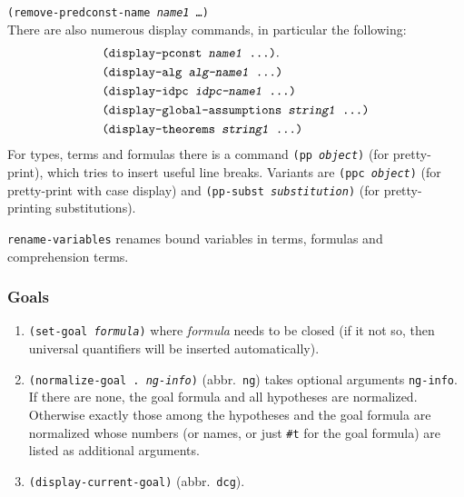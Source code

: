 \documentclass[12pt]{amsart}
\begin{document}
\begin{appendix}
\texttt{(remove-predconst-name \textsl{name1} \dots)}%
\\
There are also numerous display commands, in particular the following:
\begin{align*}
  &\texttt{(display-pconst \textsl{name1} \dots)}%
  \index{display-pconst@\texttt{display-pconst}}.
  \\
  &\texttt{(display-alg \textsl{alg-name1} \dots)}%
  \index{display-alg@\texttt{display-alg}}
  \\
  &\texttt{(display-idpc \textsl{idpc-name1} \dots)}%
  \index{display-idpc@\texttt{display-idpc}}
  \\
  &\texttt{(display-global-assumptions \textsl{string1} \dots)}%
  \index{display-global-assumptions@\texttt{display-global-assumptions}}
  \\
  &\texttt{(display-theorems \textsl{string1} \dots)}%
  \index{display-theorems@\texttt{display-theorems}}
\end{align*}
For types, terms and formulas there is a command \texttt{(pp
  \textsl{object})} (for pretty-print), which
tries to insert useful line breaks.  Variants are \texttt{(ppc
  \textsl{object})} (for pretty-print with case
display) and \texttt{(pp-subst \textsl{substitution})}%
 (for pretty-printing substitutions).

\texttt{rename-variables}%
 renames bound
variables in terms, formulas and comprehension terms.

\subsubsection{Goals}
\begin{enumerate}
\item \texttt{(set-goal \textsl{formula})}%
   where
  \textsl{formula} needs to be closed (if it not so, then universal
  quantifiers will be inserted automatically).
\item \texttt{(normalize-goal .\ \textsl{ng-info})}%
  (abbr.\ \texttt{ng}) takes optional arguments
  \texttt{ng-info}.  If there are none, the goal formula and all
  hypotheses are normalized.  Otherwise exactly those among the
  hypotheses and the goal formula are normalized whose numbers (or
  names, or just \verb+#t+ for the goal formula) are listed as
  additional arguments.
\item \texttt{(display-current-goal)}%
  (abbr.\ \texttt{dcg}).
\end{enumerate}


\end{appendix}
\end{document}

